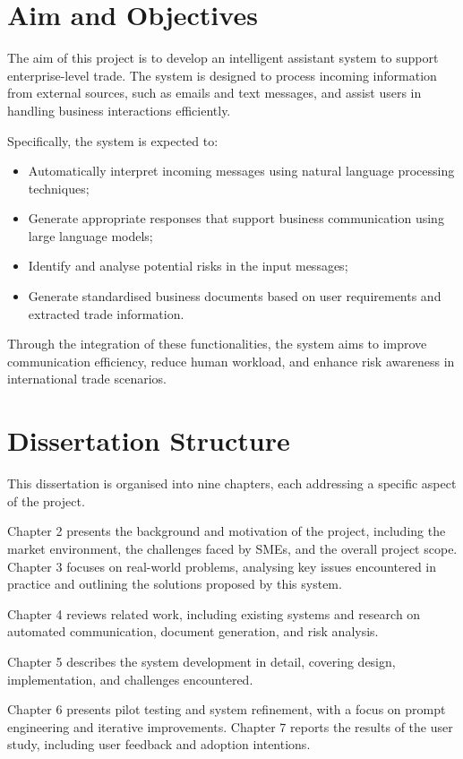 \documentclass[12pt,a4paper]{report}
\begin{document}
\section{Aim and Objectives}

The aim of this project is to develop an intelligent assistant system to support enterprise-level trade. The system is designed to process incoming information from external sources, such as emails and text messages, and assist users in handling business interactions efficiently.

Specifically, the system is expected to:
\begin{itemize}
    \item Automatically interpret incoming messages using natural language processing techniques;
    \item Generate appropriate responses that support business communication using large language models;
    \item Identify and analyse potential risks in the input messages;
    \item Generate standardised business documents based on user requirements and extracted trade information.
\end{itemize}

Through the integration of these functionalities, the system aims to improve communication efficiency, reduce human workload, and enhance risk awareness in international trade scenarios.

\section{Dissertation Structure}

This dissertation is organised into nine chapters, each addressing a specific aspect of the project.

Chapter 2 presents the background and motivation of the project, including the market environment, the challenges faced by SMEs, and the overall project scope. Chapter 3 focuses on real-world problems, analysing key issues encountered in practice and outlining the solutions proposed by this system.

Chapter 4 reviews related work, including existing systems and research on automated communication, document generation, and risk analysis.

Chapter 5 describes the system development in detail, covering design, implementation, and challenges encountered.

Chapter 6 presents pilot testing and system refinement, with a focus on prompt engineering and iterative improvements. Chapter 7 reports the results of the user study, including user feedback and adoption intentions.
\end{document}
